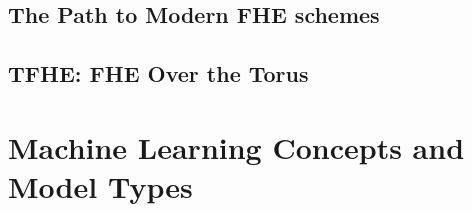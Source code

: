 \subsection{The Path to Modern FHE schemes}

\subsection{TFHE: FHE Over the Torus}

\section{Machine Learning Concepts and Model Types}
